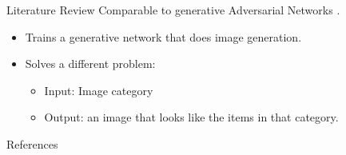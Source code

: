 \documentclass{beamer}
\begin{document}
\begin{frame}{Literature Review}
    Comparable to generative Adversarial
    Networks \cite{dosovitskiy2016generating}.
    \begin{itemize}
        \item Trains a generative network
            that does image generation.
        \item Solves a different problem:
            \begin{itemize}
                \item[] Input: Image category
                \item[] Output: an image that looks like
            the items in that category.
            \end{itemize}
    \end{itemize}
\end{frame}

\begin{frame}[allowframebreaks]{References}
    
    
\end{frame}
\end{document}

